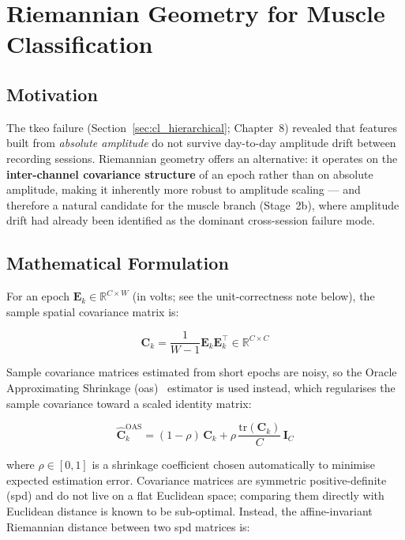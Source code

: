 \section{Riemannian Geometry for Muscle Classification}
\label{sec:cl_riemann}

\subsection{Motivation}

The \acrshort{tkeo} failure (Section~\ref{sec:cl_hierarchical};
Chapter~8) revealed that features built from \emph{absolute
amplitude} do not survive day-to-day amplitude drift between
recording sessions. Riemannian geometry offers an alternative: it
operates on the \textbf{inter-channel covariance structure} of an
epoch rather than on absolute amplitude, making it inherently more
robust to amplitude scaling --- and therefore a natural candidate
for the muscle branch (Stage~2b), where amplitude drift had already
been identified as the dominant cross-session failure mode.

\subsection{Mathematical Formulation}

For an epoch $\mathbf{E}_k \in \mathbb{R}^{C \times W}$ (in volts;
see the unit-correctness note below), the sample spatial covariance
matrix is:

\begin{equation}
\mathbf{C}_k = \frac{1}{W - 1} \mathbf{E}_k \mathbf{E}_k^{\top}
\in \mathbb{R}^{C \times C}
\label{eq:covariance}
\end{equation}

\noindent Sample covariance matrices estimated from short epochs
are noisy, so the Oracle Approximating Shrinkage
(\acrshort{oas})~\cite{barachant2012riemann} estimator is used
instead, which regularises the sample covariance toward a scaled
identity matrix:

\begin{equation}
\hat{\mathbf{C}}_k^{\text{OAS}} =
(1-\rho)\,\mathbf{C}_k + \rho\,\frac{\text{tr}(\mathbf{C}_k)}{C}\,
\mathbf{I}_C
\label{eq:oas}
\end{equation}

\noindent where $\rho \in [0,1]$ is a shrinkage coefficient chosen
automatically to minimise expected estimation error. Covariance
matrices are symmetric positive-definite (\acrshort{spd}) and do
not live on a flat Euclidean space; comparing them directly with
Euclidean distance is known to be sub-optimal. Instead, the
affine-invariant Riemannian distance between two \acrshort{spd}
matrices is:

